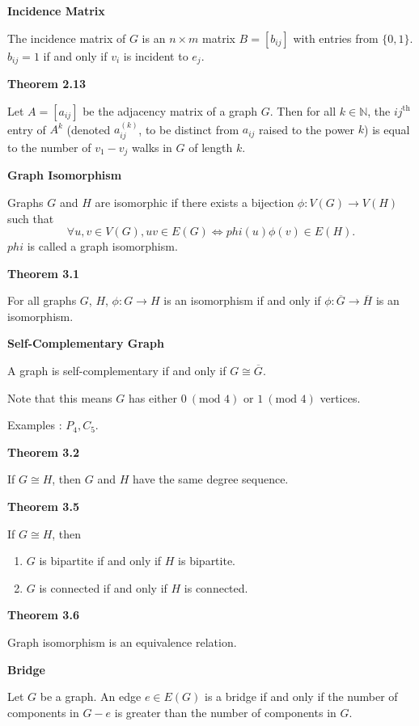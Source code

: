 \documentclass{article}
\newcommand{\N}{\mathbb N}
\begin{document}
\medskip\noindent\textbf{Incidence Matrix}

    The incidence matrix of $G$ is an $n \times m$ matrix $B = [b_{ij}]$ with entries from $\{0,1\}$.
    $b_{ij} = 1$ if and only if $v_i$ is incident to $e_j$.

\medskip\noindent\textbf{Theorem 2.13}

    Let $A = [a_{ij}]$ be the adjacency matrix of a graph $G$. Then for all $k \in \N$, the $ij^{\text{th}}$ entry of $A^k$ (denoted $a_{ij}^{(k)}$, to be distinct from $a_{ij}$ raised to the power $k$) is equal to the number of $v_1 - v_j$ walks in $G$ of length $k$.

\medskip\noindent\textbf{Graph Isomorphism}

    Graphs $G$ and $H$ are isomorphic if there exists a bijection $\phi: V(G) \to V(H)$ such that $$\forall u,v \in V(G), uv \in E(G) \iff phi(u)\phi(v) \in E(H).$$
    $phi$ is called a graph isomorphism.

\medskip\noindent\textbf{Theorem 3.1}

    For all graphs $G$, $H$, $\phi: G \to H$ is an isomorphism if and only if $\phi: \overline G \to \overline H$ is an isomorphism.

\medskip\noindent\textbf{Self-Complementary Graph}

    A graph is self-complementary if and only if $G \cong \overline G$.

    Note that this means $G$ has either $0~(\text{mod } 4)$ or $1~(\text{mod } 4)$ vertices.

    Examples : $P_4, C_5$.

\medskip\noindent\textbf{Theorem 3.2}

    If $G \cong H$, then $G$ and $H$ have the same degree sequence.

\medskip\noindent\textbf{Theorem 3.5}

    If $G \cong H$, then
    \begin{enumerate}
        \item $G$ is bipartite if and only if $H$ is bipartite.
        \item $G$ is connected if and only if $H$ is connected.
    \end{enumerate}

\medskip\noindent\textbf{Theorem 3.6}

    Graph isomorphism is an equivalence relation.

\medskip\noindent\textbf{Bridge}

    Let $G$ be a graph. An edge $e \in E(G)$ is a bridge if and only if the number of components in $G - e$ is greater than the number of components in $G$.
\end{document}
